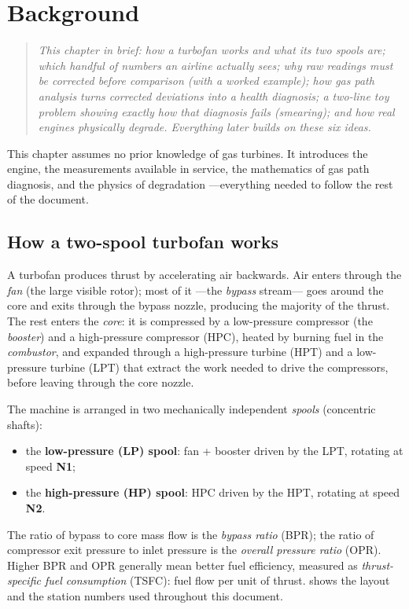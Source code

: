 \chapter{Background}
\label{ch:background}

\begin{quote}\itshape
This chapter in brief: how a turbofan works and what its two spools are; which handful of
numbers an airline actually sees; why raw readings must be corrected before comparison (with a
worked example); how gas path analysis turns corrected deviations into a health diagnosis; a
two-line toy problem showing exactly how that diagnosis fails (smearing); and how real engines
physically degrade. Everything later builds on these six ideas.
\end{quote}



This chapter assumes no prior knowledge of gas turbines. It introduces the engine, the
measurements available in service, the mathematics of gas path diagnosis, and the physics of
degradation ---everything needed to follow the rest of the document.

\section{How a two-spool turbofan works}
\label{sec:turbofan}

A turbofan produces thrust by accelerating air backwards. Air enters through the \emph{fan} (the
large visible rotor); most of it ---the \emph{bypass} stream--- goes around the core and exits
through the bypass nozzle, producing the majority of the thrust. The rest enters the \emph{core}:
it is compressed by a low-pressure compressor (the \emph{booster}) and a high-pressure
compressor (HPC), heated by burning fuel in the \emph{combustor}, and expanded through a
high-pressure turbine (HPT) and a low-pressure turbine (LPT) that extract the work needed to
drive the compressors, before leaving through the core nozzle.

The machine is arranged in two mechanically independent \emph{spools} (concentric shafts):
\begin{itemize}
  \item the \textbf{low-pressure (LP) spool}: fan + booster driven by the LPT, rotating at speed
    \textbf{N1};
  \item the \textbf{high-pressure (HP) spool}: HPC driven by the HPT, rotating at speed
    \textbf{N2}.
\end{itemize}
The ratio of bypass to core mass flow is the \emph{bypass ratio} (BPR); the ratio of compressor
exit pressure to inlet pressure is the \emph{overall pressure ratio} (OPR). Higher BPR and OPR
generally mean better fuel efficiency, measured as \emph{thrust-specific fuel consumption}
(TSFC): fuel flow per unit of thrust.  shows the layout and the
station numbers used throughout this document.


